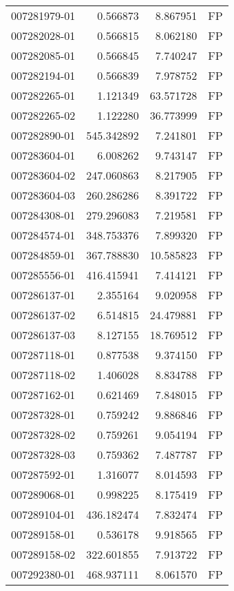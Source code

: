 \begin{tabular}{lrrl}
007281979-01 &    0.566873 &     8.867951 &   FP \\
007282028-01 &    0.566815 &     8.062180 &   FP \\
007282085-01 &    0.566845 &     7.740247 &   FP \\
007282194-01 &    0.566839 &     7.978752 &   FP \\
007282265-01 &    1.121349 &    63.571728 &   FP \\
007282265-02 &    1.122280 &    36.773999 &   FP \\
007282890-01 &  545.342892 &     7.241801 &   FP \\
007283604-01 &    6.008262 &     9.743147 &   FP \\
007283604-02 &  247.060863 &     8.217905 &   FP \\
007283604-03 &  260.286286 &     8.391722 &   FP \\
007284308-01 &  279.296083 &     7.219581 &   FP \\
007284574-01 &  348.753376 &     7.899320 &   FP \\
007284859-01 &  367.788830 &    10.585823 &   FP \\
007285556-01 &  416.415941 &     7.414121 &   FP \\
007286137-01 &    2.355164 &     9.020958 &   FP \\
007286137-02 &    6.514815 &    24.479881 &   FP \\
007286137-03 &    8.127155 &    18.769512 &   FP \\
007287118-01 &    0.877538 &     9.374150 &   FP \\
007287118-02 &    1.406028 &     8.834788 &   FP \\
007287162-01 &    0.621469 &     7.848015 &   FP \\
007287328-01 &    0.759242 &     9.886846 &   FP \\
007287328-02 &    0.759261 &     9.054194 &   FP \\
007287328-03 &    0.759362 &     7.487787 &   FP \\
007287592-01 &    1.316077 &     8.014593 &   FP \\
007289068-01 &    0.998225 &     8.175419 &   FP \\
007289104-01 &  436.182474 &     7.832474 &   FP \\
007289158-01 &    0.536178 &     9.918565 &   FP \\
007289158-02 &  322.601855 &     7.913722 &   FP \\
007292380-01 &  468.937111 &     8.061570 &   FP \\

\end{tabular}
